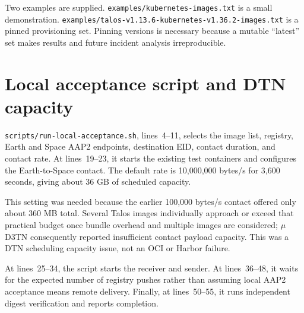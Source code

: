 \documentclass[11pt,a4paper]{article}
\newcommand{\file}[1]{\texttt{#1}}
\newcommand{\lines}[1]{lines~#1}
\begin{document}
Two examples are supplied. \file{examples/kubernetes-images.txt} is a small
demonstration. \file{examples/talos-v1.13.6-kubernetes-v1.36.2-images.txt} is
a pinned provisioning set. Pinning versions is necessary because a mutable
``latest'' set makes results and future incident analysis irreproducible.

\section{Local acceptance script and DTN capacity}
\file{scripts/run-local-acceptance.sh}, \lines{4--11}, selects the image list,
registry, Earth and Space AAP2 endpoints, destination EID, contact duration,
and contact rate. At \lines{19--23}, it starts the existing test containers and
configures the Earth-to-Space contact. The default rate is 10,000,000 bytes/s
for 3,600 seconds, giving about 36 GB of scheduled capacity.

This setting was needed because the earlier 100,000 bytes/s contact offered
only about 360 MB total. Several Talos images individually approach or exceed
that practical budget once bundle overhead and multiple images are considered;
\(\mu\)D3TN consequently reported insufficient contact payload capacity. This
was a DTN scheduling capacity issue, not an OCI or Harbor failure.

At \lines{25--34}, the script starts the receiver and sender. At
\lines{36--48}, it waits for the expected number of registry pushes rather than
assuming local AAP2 acceptance means remote delivery. Finally, at
\lines{50--55}, it runs independent digest verification and reports completion.
\end{document}
